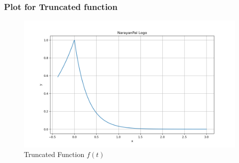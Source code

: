 \documentclass{beamer}
\theoremstyle{remark}
\numberwithin{equation}{section}
\begin{document}
\begin{frame}
\frametitle{Plot for Truncated function}
\begin{figure}
  \centering
  \includegraphics[width=0.85\linewidth]{figs/window.png}
  \caption{Truncated Function $f(t)$ }
		\label{fig:Window}
\end{figure}
\end{frame}
\end{document}
